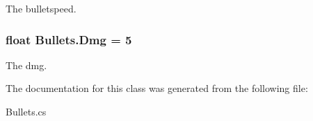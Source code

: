 The bulletspeed. 

\hypertarget{classBullets_acc3d972e4c08788a0aff8b87faf7c3a6}{
\subsubsection[{Dmg}]{\setlength{\rightskip}{0pt plus 5cm}float Bullets.\-Dmg = 5}}\label{classBullets_acc3d972e4c08788a0aff8b87faf7c3a6}


The dmg. 



The documentation for this class was generated from the following file\-:\begin{DoxyCompactItemize}
\item 
Bullets.\-cs\end{DoxyCompactItemize}
